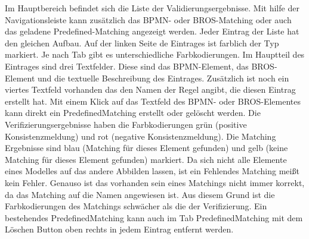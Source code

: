 Im Hauptbereich befindet sich die Liste der Validierungsergebnisse.
Mit hilfe der Navigationsleiste kann zusätzlich das BPMN- oder BROS-Matching oder auch das geladene Predefined-Matching angezeigt werden.
Jeder Eintrag der Liste hat den gleichen Aufbau.
Auf der linken Seite de Eintrages ist farblich der Typ markiert. Je nach Tab gibt es unterschiedliche Farbkodierungen.
Im Hauptteil des Eintrages sind drei Textfelder.
Diese sind das BPMN-Element, das BROS-Element und die textuelle Beschreibung des Eintrages.
Zusätzlich ist noch ein viertes Textfeld vorhanden das den Namen der Regel angibt, die diesen Eintrag erstellt hat.
Mit einem Klick auf das Textfeld des BPMN- oder BROS-Elementes kann direkt ein PredefinedMatching erstellt oder gelöscht werden.
Die Verifizierungsergebnisse haben die Farbkodierungen grün (positive Konsistenzmeldung) und rot (negative Konsistenzmeldung).
Die Matching Ergebnisse sind blau (Matching für dieses Element gefunden) und gelb (keine Matching für dieses Element gefunden) markiert.
Da sich nicht alle Elemente eines Modelles auf das andere Abbilden lassen, ist ein Fehlendes Matching meißt kein Fehler.
Genauso ist das vorhanden sein eines Matchings nicht immer korrekt, da das Matching auf die Namen angewiesen ist. 
Aus diesem Grund ist die Farbkodierungen des Matchings schwächer als die der Verifizierung.
Ein bestehendes PredefinedMatching kann auch im Tab PredefinedMatching mit dem Löschen Button oben rechts in jedem Eintrag entfernt werden.

